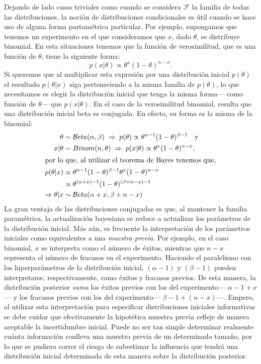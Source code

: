 {{Dejando de lado casos triviales como cuando se considera $\mathcal{F}$ la familia de todas las distribuciones, la noción de distribuciones condicionales es útil cuando se hace uso de alguna forma partamétrica particular. Por ejemplo, supongamos que tenemos un experimento en el que consideramos que $x$, dado $\theta$, se distribuye binomial. En esta situaciones tenemos que la función de verosimilitud, que es una función de $\theta$, tiene la siguiente forma: 
\begin{equation*}
p(x|\theta) \propto \theta^x(1-\theta)^{n-x}.
\end{equation*}
Si queremos que al multiplicar esta expresión por una distribución inicial $p(\theta)$ el resultado $p(\theta|x)$ siga perteneciendo a la misma familia de $p(\theta)$, lo que necesitamos es elegir la distribución inicial que tenga la misma forma--- como función de $\theta$--- que $p(x|\theta)$. En el caso de la verosimilitud binomial, resulta que una distribución inicial beta es conjugada. En efecto, su forma es la misma de la binomial:
\begin{align*}
\theta &\sim \mathcal{B}eta(\alpha,\beta) \; \Rightarrow\; p(\theta) \propto \theta^{\alpha-1}(1-\theta)^{\beta-1} \quad \text{y}\\
x|\theta &\sim Binom(n,\theta) \; \Rightarrow\; p(x|\theta) \propto \theta^{x}(1-\theta)^{n-x},\\
\intertext{por lo que, al utilizar el teorema de Bayes tenemos que,}
p(\theta|x) &\propto \theta^{\alpha-1}(1-\theta)^{\beta-1}\theta^{x}(1-\theta)^{n-x}\\ 
&\propto \theta^{(\alpha+x)-1}(1-\theta)^{(\beta+n-x)-1}\\
\Rightarrow \theta |x &\sim \mathcal{B}eta(\alpha+x, \beta+n-x)
\end{align*}
La gran ventaja de las distribuciones conjugadas es que, al mantener la familia paramétrica, la actualización bayesiana se reduce a actualizar los parámetros de la distribución inicial. Más aún, es frecuente la interpretación de los parámetros iniciales como equivalentes a una \textit{muestra previa}. Por ejemplo, en el caso binomial, $x$ se interpreta como el número de éxitos, mientras que $n-x$ representa el número de fracasos en el experimento. Haciendo el paralelismo con los hiperparámetros de la distribución inicial, $(\alpha-1)$ y $(\beta-1)$ pueden interpretarse, respectivamente, como éxitos y fracasos previos. De esta manera, la distribución posterior \textit{suma} los éxitos previos con los del experimento--- $\alpha -1 + x$--- y los fracasos previos con los del experimento--- $\beta -1 + (n-x)$---. Empero, al utilizar esta interpretación para especificar distribuciones iniciales informativas se debe cuidar que efectivamente la hipotética muestra previa refleje de manera aceptable la incertidumbre inicial. Puede no ser tan simple determinar realmente cuánta información conlleva una muestra previa de un determinado tamaño, por lo que se pudiera correr el riesgo de subestimar la influencia que tendrá una distribución inicial determinada de esta manera sobre la distribución posterior.\\ 

}}
